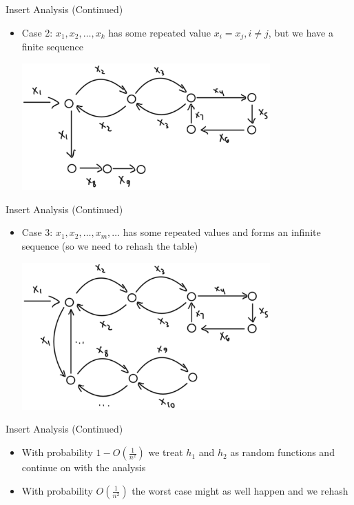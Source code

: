 \documentclass[aspectratio=169]{beamer}
\begin{document}
\begin{frame}{Insert Analysis (Continued)}
    \begin{itemize}
        \item Case 2: $x_1, x_2, \ldots, x_k$ has some repeated value $x_i = x_j, i \ne j$, but we have a finite sequence
        \begin{center}
            \includegraphics[width=0.75\textwidth]{images/case2.png}
        \end{center}
    \end{itemize}
\end{frame}

\begin{frame}{Insert Analysis (Continued)}
    \begin{itemize}
        \item Case 3: $x_1, x_2, \ldots, x_m, \ldots$ has some repeated values and forms an infinite sequence (so we need to rehash the table)
        \begin{center}
            \includegraphics[width=0.75\textwidth]{images/case3.png}
        \end{center}
    \end{itemize}
\end{frame}

\begin{frame}{Insert Analysis (Continued)}
    \begin{itemize}
        \item With probability $1 - O(\frac 1 {n^2})$ we treat $h_1$ and $h_2$ as random functions and continue on with the analysis
        \item With probability $O(\frac 1 {n^2})$ the worst case might as well happen and we rehash
    \end{itemize}
\end{frame}
\end{document}

